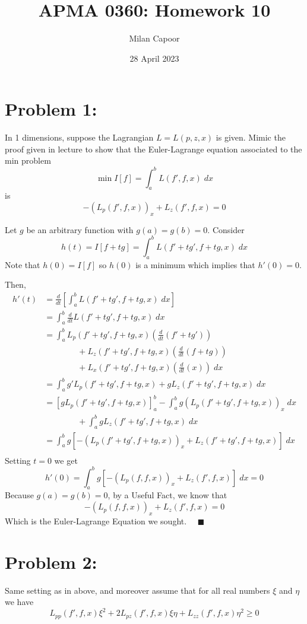 \documentclass[12pt]{article}
\title{APMA 0360: Homework 10}
\author{Milan Capoor}
\date{28 April 2023}
\newcommand{\qed}{\quad \blacksquare}
\begin{document}
\maketitle
\section*{Problem 1:} In 1 dimensions, suppose the Lagrangian
$L = L(p, z, x)$ is given. Mimic the proof given in lecture to show that the Euler-Lagrange equation associated to the min problem
\[\min I[f] = \int_a^b L(f', f, x)\; dx\]
is 
\[-(L_p(f', f, x))_x + L_z(f', f, x) = 0\]

\color{blue}
Let $g$ be an arbitrary function with $g(a) = g(b) = 0$. Consider 
\[h(t) = I[f + tg] = \int_a^b L(f' + tg', f + tg, x)\; dx \] 
Note that $h(0) = I[f]$ so $h(0)$ is a minimum which implies that $h'(0) = 0$. 

Then, 
\begin{align*}
    h'(t) &= \frac{d}{dt}\left[\int_a^b L(f' + tg', f + tg, x)\; dx\right]\\
    &= \int_a^b \frac{d}{dt} L(f' + tg', f + tg, x)\; dx\\
    &= \int_a^b L_p(f' + tg', f + tg, x)(\frac{d}{dt}(f' + tg'))\\
    &\qquad \qquad +  L_z(f' + tg', f + tg, x)(\frac{d}{dt}(f + tg)) \\
    &\qquad \qquad + L_x(f' + tg', f + tg, x)(\frac{d}{dt}(x))\; dx\\
    &= \int_a^b g'L_p(f' + tg', f + tg, x) + gL_z(f' + tg', f + tg, x)\; dx\\
    &= [gL_p(f' + tg', f + tg, x)]_a^b - \int_a^b g(L_p(f' + tg', f + tg, x))_x \; dx\\
    &\qquad \qquad + \int_a^b gL_z(f' + tg', f + tg, x)\; dx\\
    &= \int_a^b g [-(L_p(f' + tg', f+ tg, x))_x + L_z(f' + tg', f + tg, x)]\; dx\\
\end{align*}
Setting $t = 0$ we get 
\[h'(0) = \int_a^b g [-(L_p(f, f, x))_x + L_z(f', f, x)]\; dx = 0\]
Because $g(a) = g(b) = 0$, by a Useful Fact, we know that 
\[-(L_p(f, f, x))_x + L_z(f', f, x) = 0\]
Which is the Euler-Lagrange Equation we sought. $\qed$
\color{black}
\pagebreak

\section*{Problem 2:} Same setting as in above, and moreover assume
that for all real numbers $\xi$ and $\eta$ we have
\[L_{pp}(f', f, x)\xi^2 + 2L_{pz}(f', f, x)\xi \eta + L_{zz}(f' ,f, x)\eta^2 \geq 0\] 
\end{document}
